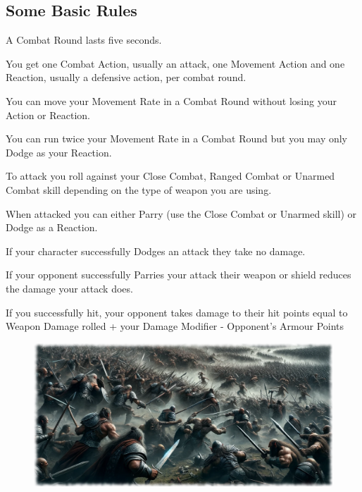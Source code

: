 \subsection{Some Basic Rules}
\begin{rpg-list}
\item A Combat Round lasts five seconds.

\item You get one Combat Action, usually an attack, one Movement Action and one Reaction, usually a defensive action, per combat round.

\item You can move your Movement Rate in a Combat Round without losing your Action or Reaction. 

\item You can run twice your Movement Rate in a Combat Round but you may only Dodge as your Reaction.

\item To attack you roll against your Close Combat, Ranged Combat or Unarmed Combat skill depending on the type of weapon you are using.

\item When attacked you can either Parry (use the Close Combat or Unarmed skill) or Dodge as a Reaction.

\item If your character successfully Dodges an attack they take no damage.

\item If your opponent successfully Parries your attack their weapon or shield reduces the damage your attack does.

\item If you successfully hit, your opponent takes damage to their hit points equal to 
	Weapon Damage rolled + your Damage Modifier - Opponent’s Armour Points
\end{rpg-list}

\begin{figure}%
\begin{center}
\includegraphics[scale=0.36]{img/ai-images/battle-large.png}
\end{center}
\end{figure}


